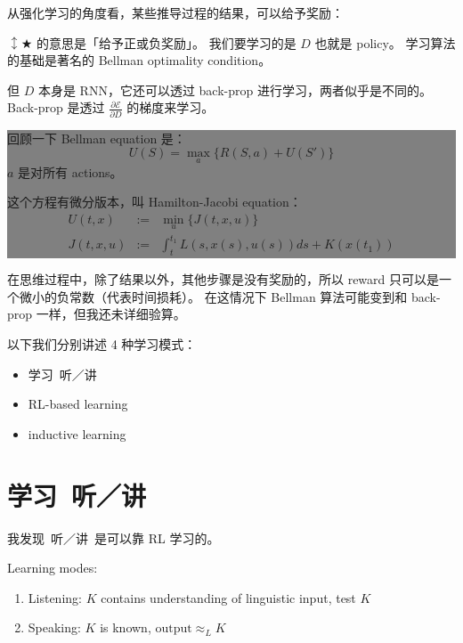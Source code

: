 \documentclass[12pt]{article}
\begin{document}
从强化学习的角度看，某些推导过程的结果，可以给予奖励：
\begin{center}
\end{center}
$\updownarrow \bigstar$ 的意思是「给予正或负奖励」。  我们要学习的是 $D$ 也就是 policy。  学习算法的基础是著名的 Bellman optimality condition。

但 $D$ 本身是 RNN，它还可以透过 back-prop 进行学习，两者似乎是不同的。  Back-prop 是透过 $\frac{\partial \mathcal{E}}{\partial D}$ 的梯度来学习。

\begin{center}
\colorbox{grey}{\parbox{0.85\textwidth}{
回顾一下 Bellman equation 是：
$$ U(S) = \max_a \{ R(S,a) + U(S') \}$$
$a$ 是对所有 actions。

这个方程有微分版本，叫 Hamilton-Jacobi equation：
\begin{eqnarray}
U(t,x) &:=& \min_u \{ J(t,x,u) \} \nonumber \\
J(t,x,u) &:=& \int_t^{t_1} L(s, x(s), u(s))ds + K(x(t_1)) \nonumber
\end{eqnarray} 
}}
\end{center}

在思维过程中，除了结果以外，其他步骤是没有奖励的，所以 reward 只可以是一个微小的负常数（代表时间损耗）。 在这情况下 Bellman 算法可能变到和 back-prop 一样，但我还未详细验算。

以下我们分别讲述 4 种学习模式：
\begin{itemize}
\item 学习~听／讲
\item RL-based learning
\item inductive learning
\end{itemize}

\section{学习~听／讲}

我发现~听／讲~是可以靠 RL 学习的。

Learning modes:
\begin{enumerate}
\item Listening:  $K$ contains understanding of linguistic input, test $K$
\item Speaking:  $K$ is known, $\mbox{output} \approx_{L} K$
\end{enumerate}
\end{document}
